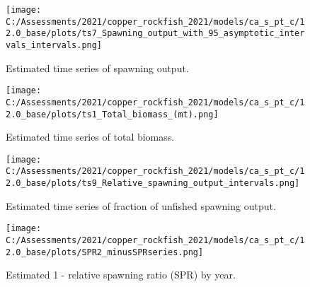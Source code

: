 \documentclass[11pt,
  english,
  a4paper,
]{article}
\begin{document}

\begin{figure}
\centering
\texttt{[image: C:/Assessments/2021/copper\_rockfish\_2021/models/ca\_s\_pt\_c/12.0\_base/plots/ts7\_Spawning\_output\_with\_95\_asymptotic\_intervals\_intervals.png]}
\caption{Estimated time series of spawning output.\label{fig:ssb}}
\end{figure}

\tagmcend\tagstructend


\begin{figure}
\centering
\texttt{[image: C:/Assessments/2021/copper\_rockfish\_2021/models/ca\_s\_pt\_c/12.0\_base/plots/ts1\_Total\_biomass\_(mt).png]}
\caption{Estimated time series of total biomass.\label{fig:tot-bio}}
\end{figure}

\tagmcend\tagstructend


\begin{figure}
\centering
\texttt{[image: C:/Assessments/2021/copper\_rockfish\_2021/models/ca\_s\_pt\_c/12.0\_base/plots/ts9\_Relative\_spawning\_output\_intervals.png]}
\caption{Estimated time series of fraction of unfished spawning output.\label{fig:depl}}
\end{figure}

\tagmcend\tagstructend


\begin{figure}
\centering
\texttt{[image: C:/Assessments/2021/copper\_rockfish\_2021/models/ca\_s\_pt\_c/12.0\_base/plots/SPR2\_minusSPRseries.png]}
\caption{Estimated 1 - relative spawning ratio (SPR) by year.\label{fig:1-spr}}
\end{figure}

\tagmcend\tagstructend

\end{document}
